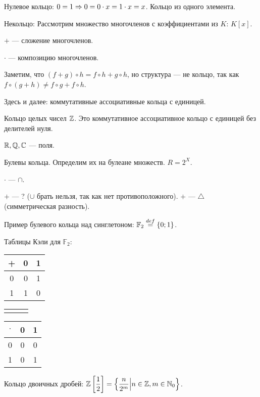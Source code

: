 \documentclass[a4paper]{report}
\begin{document}
{        \item Нулевое кольцо: $0 = 1 \Rightarrow 0 = 0 \cdot x = 1 \cdot x = x$. Кольцо из одного элемента.
        \item Некольцо: Рассмотрим множество многочленов с коэффициентами из $K$: $K[x]$.

        $+$ --- сложение многочленов.

        $\cdot$ --- композицию многочленов.

        Заметим, что $(f + g) \circ h = f\circ h + g \circ h$, но структура --- не кольцо, так как $f \circ (g + h) \ne f \circ g + f \circ h$.
        \item Здесь и далее: коммутативные ассоциативные кольца с единицей.

        Кольцо целых чисел $\mathbb{Z}$. Это коммутативное ассоциативное кольцо с единицей без делителей нуля.

        $\mathbb{R}, \mathbb{Q}, \mathbb{C}$ --- поля.

        \item Булевы кольца. Определим их на булеане множеств. $R = 2^X$.

        $\cdot$ --- $\cap$.

        $+$ --- ? ($\cup$ брать нельзя, так как нет противоположного). $+$ --- $\triangle$ (симметрическая разность).

        Пример булевого кольца над синглетоном: $\mathbb{F}_2 \overset{def}{=} \{0; 1\}$.

        Таблицы Кэли для $\mathbb{F}_2$:
        \begin{table}[!ht]
            \centering

            \begin{tabular}{c | c c}
                + & 0 & 1 \\
                \hline
                0 & 0 & 1 \\
                1 & 1 & 0 \\
            \end{tabular}
            \begin{tabular}{c c c}
                & &
            \end{tabular}
            \begin{tabular}{c | c c}
                $\cdot$ & 0 & 1 \\
                \hline
                0       & 0 & 0 \\
                1       & 0 & 1 \\
            \end{tabular}
        \end{table}
        \item Кольцо двоичных дробей: $\mathbb{Z}\left[\dfrac{1}{2}\right] = \left\{\dfrac{n}{2^m}\middle|n\in \mathbb{Z}, m \in \mathbb{N}_0\right\}$.

}
\end{document}
